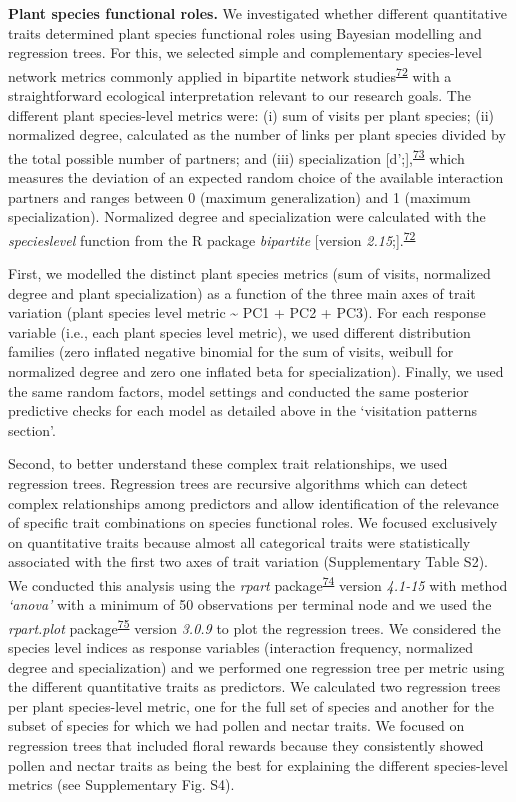\documentclass[
  12pt,
  a4paper,
]{article}
\begin{document}
\textbf{Plant species functional roles.} We investigated whether different quantitative traits determined plant species functional roles using Bayesian modelling and regression trees. For this, we selected simple and complementary species-level network metrics commonly applied in bipartite network studies\textsuperscript{\protect\hyperlink{ref-dormann2008}{72}} with a straightforward ecological interpretation relevant to our research goals. The different plant species-level metrics were: (i) sum of visits per plant species; (ii) normalized degree, calculated as the number of links per plant species divided by the total possible number of partners; and (iii) specialization {[}d';{]},\textsuperscript{\protect\hyperlink{ref-bluthgen2006}{73}} which measures the deviation of an expected random choice of the available interaction partners and ranges between 0 (maximum generalization) and 1 (maximum specialization). Normalized degree and specialization were calculated with the \emph{specieslevel} function from the R package \emph{bipartite} {[}version \emph{2.15};{]}.\textsuperscript{\protect\hyperlink{ref-dormann2008}{72}}

First, we modelled the distinct plant species metrics (sum of visits, normalized degree and plant specialization) as a function of the three main axes of trait variation (plant species level metric \textasciitilde{} PC1 + PC2 + PC3). For each response variable (i.e., each plant species level metric), we used different distribution families (zero inflated negative binomial for the sum of visits, weibull for normalized degree and zero one inflated beta for specialization). Finally, we used the same random factors, model settings and conducted the same posterior predictive checks for each model as detailed above in the `visitation patterns section'.

Second, to better understand these complex trait relationships, we used regression trees. Regression trees are recursive algorithms which can detect complex relationships among predictors and allow identification of the relevance of specific trait combinations on species functional roles. We focused exclusively on quantitative traits because almost all categorical traits were statistically associated with the first two axes of trait variation (Supplementary Table S2). We conducted this analysis using the \emph{rpart} package\textsuperscript{\protect\hyperlink{ref-therneau2015}{74}} version \emph{4.1-15} with method \emph{`anova'} with a minimum of 50 observations per terminal node and we used the \emph{rpart.plot} package\textsuperscript{\protect\hyperlink{ref-milborrow2015}{75}} version \emph{3.0.9} to plot the regression trees. We considered the species level indices as response variables (interaction frequency, normalized degree and specialization) and we performed one regression tree per metric using the different quantitative traits as predictors. We calculated two regression trees per plant species-level metric, one for the full set of species and another for the subset of species for which we had pollen and nectar traits. We focused on regression trees that included floral rewards because they consistently showed pollen and nectar traits as being the best for explaining the different species-level metrics (see Supplementary Fig. S4).
\end{document}
